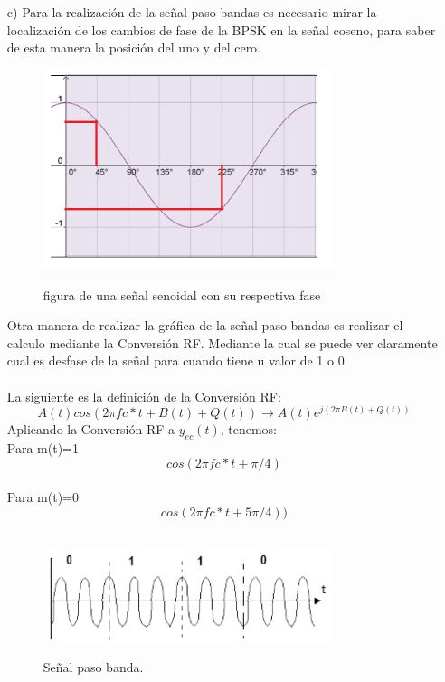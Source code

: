 \begin{itemize}
\item[c)] Para la realización de la señal paso bandas es necesario mirar la localización de los cambios de fase de la BPSK en la señal coseno, para saber de esta manera la posición del uno y del cero.

 \begin{figure}[h!]
	\captionsetup{justification = raggedright, singlelinecheck = false}
    \caption{figura de una señal senoidal con su respectiva fase}
    \centering
    \includegraphics[width=0.8\textwidth]{Imagenes/fas.PNG}
    \label{fig:fas}
\end{figure}

Otra manera de realizar la gráfica de la señal paso bandas es realizar el calculo mediante la Conversión RF. Mediante la cual se puede ver claramente cual es desfase de la señal para cuando tiene u valor de 1 o 0.
\\
\\
La siguiente es la definición de la Conversión RF:
 \begin{equation} \label{capdos_veintisiete}
A(t)cos(2\pi fc*t+B(t)+Q(t))\rightarrow A(t)e^{j(2\pi B(t)+Q(t))}
 \end{equation}
 Aplicando la Conversión RF a $y_{ec}(t)$, tenemos:
\\
Para m(t)=1
 \begin{equation} \label{capdos_veintiocho}
cos(2\pi fc*t+\pi /4)
\end{equation}
\\
Para m(t)=0
 \begin{equation} \label{capdos_veintinueve}
cos(2\pi fc*t+5\pi /4))
\end{equation}
\\

 \begin{figure}[h!]
	\captionsetup{justification = raggedright, singlelinecheck = false}
    \caption{Señal paso banda.}
    \centering
    \includegraphics[width=0.8\textwidth]{Imagenes/bit.PNG}
    \label{fig:bit-taller}
\end{figure}


\end{itemize}
 
